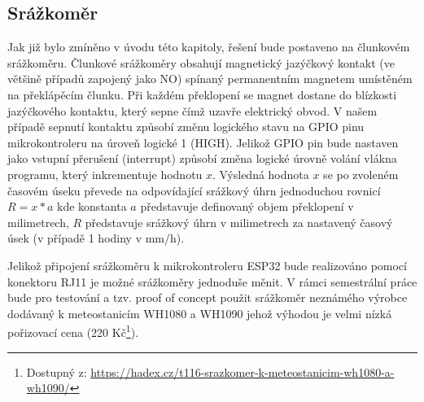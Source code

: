 \subsection{Srážkoměr}
\par Jak již bylo zmíněno v úvodu této kapitoly, řešení bude postaveno na člunkovém srážkoměru. Člunkové srážkoměry obsahují magnetický jazýčkový kontakt (ve většině případů zapojený jako NO) spínaný permanentním magnetem umístěném na překlápěcím člunku. Při každém překlopení se magnet dostane do blízkosti jazýčkového kontaktu, který sepne čímž uzavře elektrický obvod. V našem případě sepnutí kontaktu způsobí změnu logického stavu na GPIO pinu mikrokontroleru na úroveň logické 1 (HIGH). Jelikož GPIO pin bude nastaven jako vstupní přerušení (interrupt) způsobí změna logické úrovně volání vlákna programu, který inkrementuje hodnotu $x$. Výsledná hodnota $x$ se po zvoleném časovém úseku převede na odpovídající srážkový úhrn jednoduchou rovnicí $R = x*a$ kde konstanta $a$ představuje definovaný objem překlopení v milimetrech, $R$ představuje srážkový úhrn v milimetrech za nastavený časový úsek (v případě 1 hodiny v mm/h).
\par Jelikož připojení srážkoměru k mikrokontroleru ESP32 bude realizováno pomocí konektoru RJ11 je možné srážkoměry jednoduše měnit. V rámci semestrální práce bude pro testování a tzv. proof of concept použit srážkoměr neznámého výrobce dodávaný k meteostanicím WH1080 a WH1090 jehož výhodou je velmi nízká pořizovací cena (220 Kč\footnote{Dostupný z: \url{https://hadex.cz/t116-srazkomer-k-meteostanicim-wh1080-a-wh1090/}}).

